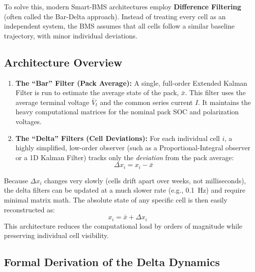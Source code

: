 To solve this, modern Smart-BMS architectures employ \textbf{Difference Filtering} (often called the Bar-Delta approach). Instead of treating every cell as an independent system, the BMS assumes that all cells follow a similar baseline trajectory, with minor individual deviations.

\subsection{Architecture Overview}
\label{subsec:14_bar_delta_overview}

\begin{enumerate}
    \item \textbf{The ``Bar'' Filter (Pack Average):}
    A single, full-order Extended Kalman Filter is run to estimate the average state of the pack, $\bar{x}$. This filter uses the average terminal voltage $\bar{V}_t$ and the common series current $I$. It maintains the heavy computational matrices for the nominal pack SOC and polarization voltages.

    \item \textbf{The ``Delta'' Filters (Cell Deviations):}
    For each individual cell $i$, a highly simplified, low-order observer (such as a Proportional-Integral observer or a 1D Kalman Filter) tracks only the \emph{deviation} from the pack average:
    \begin{equation}
        \Delta x_i = x_i - \bar{x}
        \label{eq:14_delta_x}
    \end{equation}
\end{enumerate}

Because $\Delta x_i$ changes very slowly (cells drift apart over weeks, not milliseconds), the delta filters can be updated at a much slower rate (e.g., 0.1~Hz) and require minimal matrix math. The absolute state of any specific cell is then easily reconstructed as:
\begin{equation}
    x_i = \bar{x} + \Delta x_i
    \label{eq:14_reconstruct_x}
\end{equation}
This architecture reduces the computational load by orders of magnitude while preserving individual cell visibility.

\subsection{Formal Derivation of the Delta Dynamics}
\label{subsec:14_delta_derivation}

